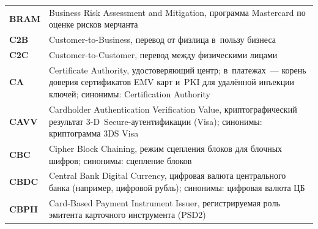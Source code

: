\begin{longtable}{@{}p{4.5em}p{\dimexpr\linewidth-4.5em-2\tabcolsep\relax}@{}}
  \textbf{BRAM}              & Business Risk Assessment and Mitigation, программа Mastercard по оценке рисков мерчанта                                                                                                                                                                                                          \\
  \textbf{C2B}               & Customer-to-Business, перевод от физлица в~пользу бизнеса                                                                                                                                                                                                                                        \\
  \textbf{C2C}               & Customer-to-Customer, перевод между физическими лицами                                                                                                                                                                                                                                           \\
  \textbf{CA}                & Certificate Authority, удостоверяющий центр; в~платежах~--- корень доверия сертификатов EMV карт и~PKI для удалённой инъекции ключей; синонимы: Certification Authority                                                                                                                           \\
  \textbf{CAVV}              & Cardholder Authentication Verification Value, криптографический результат 3-D~Secure-аутентификации (Visa); синонимы: криптограмма 3DS Visa                                                                                                                                                       \\
  \textbf{CBC}               & Cipher Block Chaining, режим сцепления блоков для блочных шифров; синонимы: сцепление блоков                                                                                                                                                                                                     \\
  \textbf{CBDC}              & Central Bank Digital Currency, цифровая валюта центрального банка (например, цифровой рубль); синонимы: цифровая валюта ЦБ                                                                                                                                                                        \\
  \textbf{CBPII}             & Card-Based Payment Instrument Issuer, регистрируемая роль эмитента карточного инструмента (PSD2)                                                                                                                                                                                                 \\

\end{longtable}
